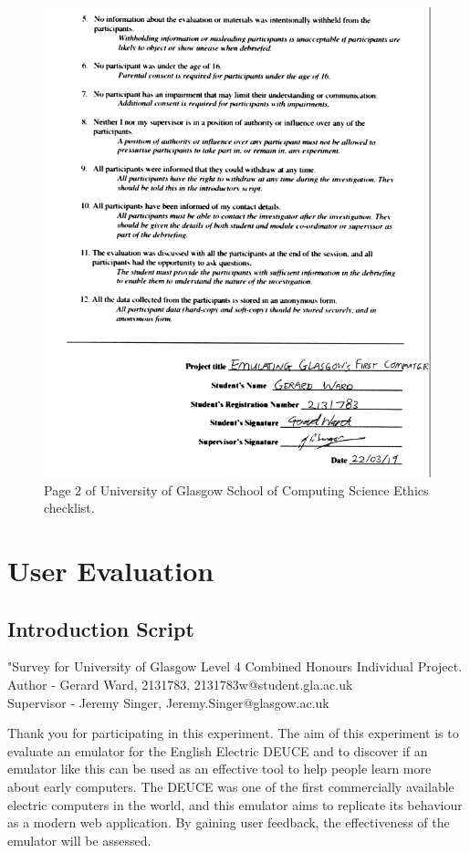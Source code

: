 \documentclass{l4proj}
\begin{document}
\begin{appendices}
\begin{figure}[h!]
	\centering
	\includegraphics{images/consent-2}
	\caption{Page 2 of University of Glasgow School of Computing Science Ethics checklist.}
	\label{fig:consent-2}
\end{figure}
	
\chapter{User Evaluation}


\section{Introduction Script}
"Survey for University of Glasgow Level 4 Combined Honours Individual Project. \\
Author - Gerard Ward, 2131783, 2131783w@student.gla.ac.uk \\
Supervisor - Jeremy Singer, Jeremy.Singer@glasgow.ac.uk

Thank you for participating in this experiment. The aim of this experiment is to evaluate an emulator for the English Electric DEUCE and to discover if an emulator like this can be used as an effective tool to help people learn more about early computers. The DEUCE was one of the first commercially available electric computers in the world, and this emulator aims to replicate its behaviour as a modern web application. By gaining user feedback, the effectiveness of the emulator will be assessed.  


\end{appendices}
\end{document}
